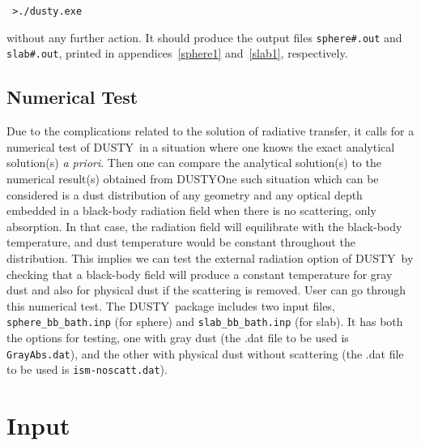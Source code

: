 \documentclass[11pt]{article}
\def\D  {{\sf DUSTY}}
\begin{document}
\bigskip
{\tt
>./dusty.exe
}

\bigskip\noindent without any further action. It should produce the
output files {\tt sphere\#.out} and {\tt slab\#.out}, printed in
appendices~\ref{sphere1} and~\ref{slab1}, respectively.

\subsection{Numerical Test}

Due to the complications related to the solution of radiative transfer, it
calls for a numerical test of \D\ in a situation where one knows the exact
analytical solution(s) {\it a priori}. Then one can compare the analytical
solution(s) to the numerical result(s) obtained from \D\. One such situation
which can be considered is a dust distribution of any geometry and any optical
depth embedded in a black-body radiation field  when there is no scattering,
only absorption. In that case, the radiation field will equilibrate with the
black-body temperature, and dust temperature would be constant throughout the
distribution. This implies we can test the external radiation option of \D\ by
checking that a black-body field will produce a constant temperature for gray
dust and also for physical dust if the scattering is removed. User can go
through this numerical test. The \D\ package includes two input files, {\tt
sphere\_bb\_bath.inp} (for sphere) and {\tt slab\_bb\_bath.inp} (for slab). It
has both the options for testing, one with gray dust (the .dat file to be used
is {\tt GrayAbs.dat}), and the other with physical dust without scattering (the
.dat file to be used is {\tt ism-noscatt.dat}).

\section{Input}
\label{input}
\end{document}
